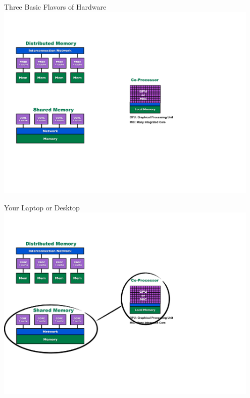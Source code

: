 \begin{frame}
  \begin{block}{Three Basic Flavors of Hardware}
    \includegraphics[width=0.95\textwidth]{../common/pics/ParallelHardware1.pdf}
  \end{block}
\end{frame}

\begin{frame}
  \begin{block}{Your Laptop or Desktop}
    \includegraphics[width=0.95\textwidth]{../common/pics/ParallelHardware2.pdf}
  \end{block}
\end{frame}

